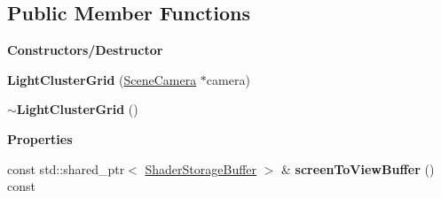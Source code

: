\subsection*{Public Member Functions}
\begin{Indent}\textbf{ Constructors/\+Destructor}\par
\begin{DoxyCompactItemize}
\item 
\mbox{\label{classrev_1_1_light_cluster_grid_a0f21ae78e37ad733721fd94d2ed5a432}} 
{\bfseries Light\+Cluster\+Grid} (\mbox{\hyperlink{classrev_1_1_scene_camera}{Scene\+Camera}} $\ast$camera)
\item 
\mbox{\label{classrev_1_1_light_cluster_grid_a5e396dc26b0aabe9859a95a4f18a1700}} 
{\bfseries $\sim$\+Light\+Cluster\+Grid} ()
\end{DoxyCompactItemize}
\end{Indent}
\begin{Indent}\textbf{ Properties}\par
\begin{DoxyCompactItemize}
\item 
\mbox{\label{classrev_1_1_light_cluster_grid_a5c035e784eebf9c0d6d79e74454328a2}} 
const std\+::shared\+\_\+ptr$<$ \mbox{\hyperlink{classrev_1_1_shader_storage_buffer}{Shader\+Storage\+Buffer}} $>$ \& {\bfseries screen\+To\+View\+Buffer} () const
\end{DoxyCompactItemize}
\end{Indent}
